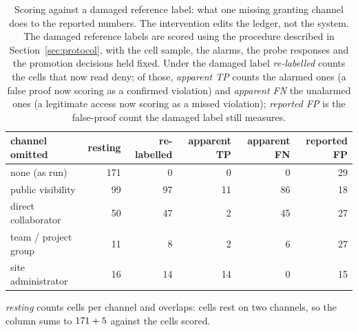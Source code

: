 \begin{table}[t]
\centering
\caption{Scoring against a damaged reference label: what one missing granting channel does to the reported numbers. The intervention edits the ledger, not the system. The damaged reference labels are scored using the procedure described in Section~\ref{sec:protocol}, with the cell sample, the alarms, the probe responses and the promotion decisions held fixed. Under the damaged label \emph{re-labelled} counts the cells that now read deny; of those, \emph{apparent TP} counts the alarmed ones (a false proof now scoring as a confirmed violation) and \emph{apparent FN} the unalarmed ones (a legitimate access now scoring as a missed violation); \emph{reported FP} is the false-proof count the damaged label still measures.}
\label{tab:ledger}
\small
\begin{tabular}{lrrrrr}
\toprule
channel omitted & resting & re-labelled & apparent TP & apparent FN & reported FP \\
\midrule
none (as run) & 171 & 0 & 0 & 0 & 29 \\
\midrule
public visibility & 99 & 97 & 11 & 86 & 18 \\
direct collaborator & 50 & 47 & 2 & 45 & 27 \\
team / project group & 11 & 8 & 2 & 6 & 27 \\
site administrator & 16 & 14 & 14 & 0 & 15 \\
\bottomrule
\end{tabular}
\par\smallskip\footnotesize\emph{resting} counts cells per channel and overlaps: \LedMultiBasis{} cells rest on two channels, so the column sums to $171+5$ against the \LedLegitCells{} cells scored.
\end{table}
